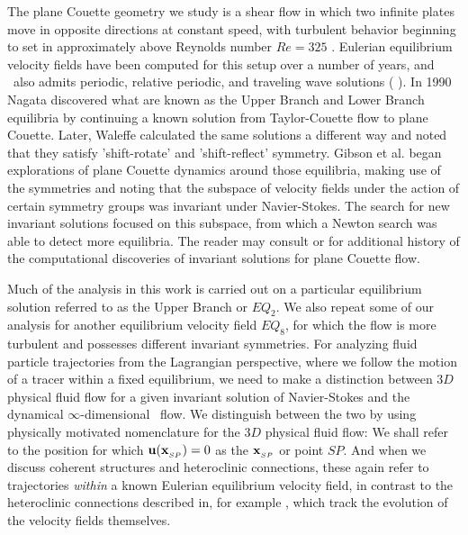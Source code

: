 \documentclass[letter,12pt,openany]{article}
\begin{document}
The plane Couette geometry we study is a shear flow in which two infinite plates move in opposite directions at constant speed, with turbulent behavior beginning to set in approximately above Reynolds number $Re=325$ \cite{HGCV09}. 
Eulerian equilibrium velocity fields have been computed for this setup over a number of years, and \pCf\ also admits periodic, relative periodic, and traveling wave solutions (\cite{HGCV09} \cite{DV04}). In 1990 Nagata \cite{N90} discovered what are known as the Upper Branch and Lower Branch equilibria by continuing a known solution from Taylor-Couette flow to plane
Couette. Later, Waleffe \cite{W03}
calculated the same solutions a different way and noted that they
satisfy 'shift-rotate' and 'shift-reflect' symmetry. Gibson et al. \cite{GHCW07} began explorations of plane Couette dynamics around
those equilibria, making use of the symmetries and noting that the subspace of velocity fields under the action of certain symmetry groups was invariant under Navier-Stokes.
The search for new invariant solutions focused on this subspace, from which a Newton search was able to detect more equilibria. The reader may consult \cite{HGCV09} or \cite{GHCW07} for additional history of the computational discoveries of invariant solutions for plane Couette flow.

Much of the analysis in this work is carried out on a particular equilibrium solution referred to as the Upper Branch or $EQ_2$.
    We also repeat some of our analysis  for another equilibrium velocity field $EQ_8$, for which the flow is more turbulent
    and possesses different invariant symmetries.
For analyzing fluid particle trajectories from the Lagrangian perspective, where we follow the motion of a tracer within a fixed equilibrium,  we need to make a distinction between
$3D$ physical fluid flow for a given invariant solution of Navier-Stokes
and the dynamical $\infty$-dimensional \statesp\ flow. We distinguish between the two by using physically motivated nomenclature
for the $3D$ physical fluid flow: We shall refer to the position
 for which
${\bf u}({\bf x}_{_{SP}})=0$
as the {\em \stagp} ${\bf x}_{_{SP}}$ or point $SP$. And when we discuss coherent structures and heteroclinic connections, these again refer to trajectories \textit{within} a known Eulerian equilibrium velocity field, in contrast to the heteroclinic connections described in, for example \cite{HGCV09}, which track the evolution of the velocity fields themselves.
\end{document}
